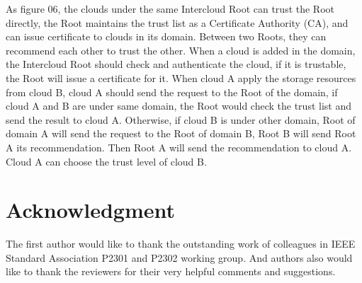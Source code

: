 \documentclass[conference]{IEEEtran}
\begin{document}
As figure 06, the clouds under the same Intercloud Root can trust the Root directly, the Root maintains the trust list as a Certificate Authority (CA), and can issue certificate to clouds in its domain. Between two Roots, they can recommend each other to trust the other. When a cloud is added in the domain, the Intercloud Root should check and authenticate the cloud, if it is trustable, the Root will issue a certificate for it. When cloud A apply the storage resources from cloud B, cloud A should send the request to the Root of the domain, if cloud A and B are under same domain, the Root would check the trust list and send the result to cloud A. Otherwise, if cloud B is under other domain, Root of domain A will send the request to the Root of domain B, Root B will send Root A its recommendation. Then Root A will send the recommendation to cloud A. Cloud A can choose the trust level of cloud B.

\section*{Acknowledgment}
The first author would like to thank the outstanding work of colleagues in IEEE Standard Association P2301 and P2302 working group. And authors also would like to thank the reviewers for their very helpful comments and suggestions.


\nocite{*}


\end{document}
